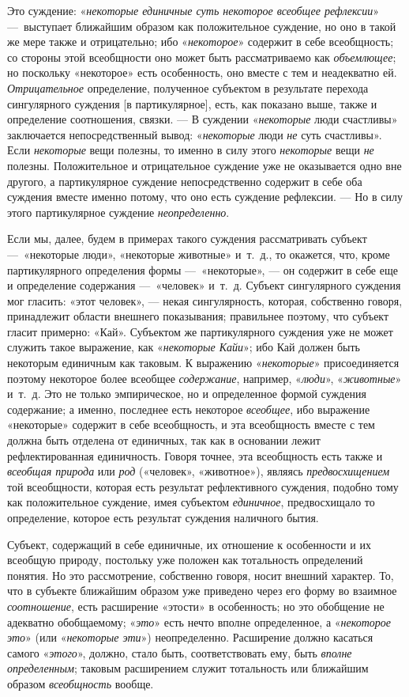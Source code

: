 \documentclass[twoside]{article}
\begin{document}
{{Это суждение:
«{\em некоторые единичные суть некоторое
всеобщее рефлексии}» —~выступает ближайшим образом как
положительное суждение, но оно в такой же мере также и отрицательно; ибо
«{\em некоторое}»
содержит в себе всеобщность; со стороны этой всеобщности оно
может быть рассматриваемо как
{\em объемлющее}; но
поскольку «некоторое» есть особенность, оно вместе с тем и неадекватно ей.
{\em Отрицательное}
определение, полученное субъектом в результате перехода
сингулярного суждения [в партикулярное], есть, как показано выше, также и
определение соотношения, связки. — В суждении
«{\em некоторые} люди
счастливы» заключается непосредственный вывод:
«{\em некоторые} люди
{\em не} суть счастливы».
Если {\em некоторые} вещи
полезны, то именно в силу этого
{\em некоторые} вещи
{\em не} полезны.
Положительное и отрицательное суждение уже не оказывается одно вне другого,
а партикулярное суждение непосредственно содержит в себе оба суждения
вместе именно потому, что оно есть суждение рефлексии. — Но
в силу этого партикулярное суждение
{\em неопределенно}.

Если мы, далее, будем в примерах такого суждения рассматривать
субъект —~«некоторые люди», «некоторые животные» и~т.~д., то
окажется, что, кроме партикулярного определения формы
—~«некоторые», — он содержит в себе еще и
определение содержания —~«человек» и~т.~д. Субъект
сингулярного суждения мог гласить: «этот человек», — некая
сингулярность, которая, собственно говоря, принадлежит области внешнего
показывания; правильнее поэтому, что субъект гласит примерно: «Кай».
Субъектом же партикулярного суждения уже не может служить такое выражение,
как «{\em некоторые
Кайи}»; ибо Кай должен быть некоторым единичным как таковым.
К выражению «{\em некоторые}»
присоединяется поэтому некоторое более всеобщее
{\em содержание},
например, «{\em люди}»,
«{\em животные}» и~т.~д.
Это не только эмпирическое, но и определенное формой суждения содержание; а
именно, последнее есть некоторое
{\em всеобщее}, ибо
выражение «некоторые» содержит в себе всеобщность, и эта всеобщность вместе
с тем должна быть отделена от единичных, так как в основании лежит
рефлектированная единичность. Говоря точнее, эта всеобщность есть также и
{\em всеобщая природа}
или {\em род}
(«человек», «животное»), являясь
{\em предвосхищением} той
всеобщности, которая есть результат рефлективного суждения, подобно тому
как положительное суждение, имея субъектом
{\em единичное},
предвосхищало то определение, которое есть результат суждения
наличного бытия.

Субъект, содержащий в себе единичные, их отношение к
особенности и их всеобщую природу, постольку уже положен как тотальность
определений понятия. Но это рассмотрение, собственно говоря, носит внешний
характер. То, что в субъекте ближайшим образом уже приведено через его
форму во взаимное {\em соотношение},
есть расширение «этости» в особенность; но это обобщение не
адекватно обобщаемому; «{\em это}»
есть нечто вполне определенное, а
«{\em некоторое это}»
(или «{\em некоторые
эти}») неопределенно. Расширение должно касаться самого
«{\em этого}», должно,
стало быть, соответствовать ему, быть
{\em вполне определенным};
таковым расширением служит тотальность или ближайшим образом
{\em всеобщность}
вообще.

}}
\end{document}
